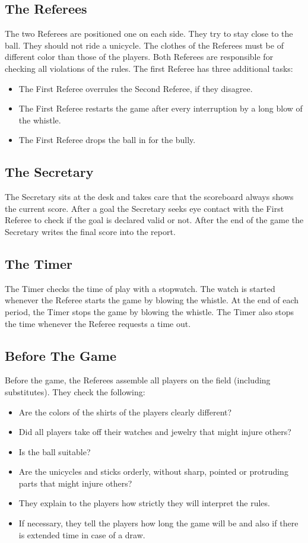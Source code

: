 \subsection{The Referees}
The two Referees are positioned one on each side.
They try to stay close to the ball.
They should not ride a unicycle.
The clothes of the Referees must be of different color than those of the players.
Both Referees are responsible for checking all violations of the rules.
The first Referee has three additional tasks:
\begin{itemize}
\item The First Referee overrules the Second Referee, if they disagree.
\item The First Referee restarts the game after every interruption by a long blow of the whistle.
\item The First Referee drops the ball in for the bully.
\end{itemize}

\subsection{The Secretary}
The Secretary sits at the desk and takes care that the scoreboard always shows the current score.
After a goal the Secretary seeks eye contact with the First Referee to check if the goal is declared valid or not.
After the end of the game the Secretary writes the final score into the report.

\subsection{The Timer}
The Timer checks the time of play with a stopwatch.
The watch is started whenever the Referee starts the game by blowing the whistle.
At the end of each period, the Timer stops the game by blowing the whistle.
The Timer also stops the time whenever the Referee requests a time out.

\subsection{Before The Game}
Before the game, the Referees assemble all players on the field (including substitutes).
They check the following:
\begin{itemize}
\item Are the colors of the shirts of the players clearly different?
\item Did all players take off their watches and jewelry that might injure others?
\item Is the ball suitable?
\item Are the unicycles and sticks orderly, without sharp, pointed or protruding parts that might injure others?
\item They explain to the players how strictly they will interpret the rules.
\item If necessary, they tell the players how long the game will be and also if there is extended time in case of a draw.
\end{itemize}

